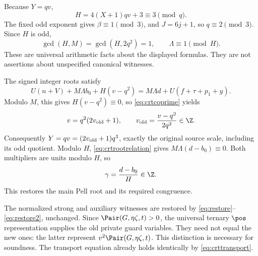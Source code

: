 Because \(Y=qv\),
\[
H=4(X+1)qv+3\equiv3\pmod q.
\]
The fixed odd exponent gives \(\beta\equiv1\pmod3\), and
\(J=6j+1\), so \(q\equiv2\pmod3\). Since \(H\) is odd,
\begin{equation}
\gcd(H,M)=\gcd(H,2q^2)=1,\qquad \Lambda\equiv1\pmod H.
\label{eq:crtcoprime}
\end{equation}
These are universal arithmetic facts about the displayed formulas.
They are not assertions about unspecified canonical witnesses.

The signed integer roots satisfy
\begin{equation}
U(n+V)+M\Lambda b_0+H(v-q^2)
=M\Lambda d+U(f+\tau+p_1+y).
\label{eq:crtrootrelation}
\end{equation}
Modulo \(M\), this gives \(H(v-q^2)\equiv0\), so
\eqref{eq:crtcoprime} yields
\begin{equation}
v=q^2(2v_{\rm old}+1),\qquad
v_{\rm old}=\frac{v-q^2}{2q^2}\in\Z.
\label{eq:crtoldscale}
\end{equation}
Consequently \(Y=qv=(2v_{\rm old}+1)q^3\), exactly the original
source scale, including its odd quotient. Modulo \(H\),
\eqref{eq:crtrootrelation} gives
\(M\Lambda(d-b_0)\equiv0\). Both multipliers are units modulo
\(H\), so
\begin{equation}
\gamma=\frac{d-b_0}{H}\in\Z.
\label{eq:crtoldgamma}
\end{equation}
This restores the main Pell root and its required congruence.

The normalized strong and auxiliary witnesses are restored by
\eqref{eq:restore}--\eqref{eq:restore2}, unchanged. Since
\(\Pair(G,\eta\zeta,t)>0\), the universal ternary \(\pos\)
representation supplies the old private guard variables. They need
not equal the new ones: the latter represent
\(v^2\Pair(G,\eta\zeta,t)\). This distinction is necessary for
soundness. The transport equation already holds identically by
\eqref{eq:crttransport}.

